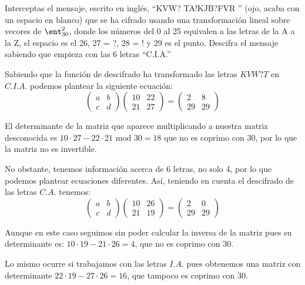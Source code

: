 \begin{problem}[4]
Interceptas el mensaje, escrito en inglés, ``KVW? TA!KJB?FVR '' (ojo, acaba con un espacio en blanco) que se ha cifrado usando una transformación lineal sobre vecores de $\ent_{30}^2$, donde los números del 0 al 25 equivalen a las letras de la A a la Z, el espacio es el 26, 27 = ?, 28 = ! y 29 es el punto. Descifra el mensaje sabiendo que empieza con las 6 letras ``C.I.A.''

\solution
{}

Sabiendo que la función de descifrado ha transformado las letras $KVW? T$ en $C.I.A.$ podemos plantear la siguiente ecuación:
\[
	\left( \begin{array}{cc}
	a & b \\
	c & d
	\end{array} \right)
	\left( \begin{array}{cc}
	10 & 22\\
	21 & 27
	\end{array} \right)
	=
	\left( \begin{array}{cc}
	2 & 8\\
	29 & 29
	\end{array} \right)
\]

El determinante de la matriz que aparece multiplicando a nuestra matriz desconocida es $10 \cdot 27 - 22 \cdot 21 \text{ mod } 30 = 18$ que no es coprimo con 30, por lo que la matriz no es invertible.

No obstante, tenemos información acerca de 6 letras, no solo 4, por lo que podemos plantear ecuaciones diferentes. Así, teniendo en cuenta el descifrado de las letras $C.A.$ tenemos:
\[
	\left( \begin{array}{cc}
	a & b \\
	c & d
	\end{array} \right)
	\left( \begin{array}{cc}
	10 & 26\\
	21 & 19
	\end{array} \right)
	=
	\left( \begin{array}{cc}
	2 & 0\\
	29 & 29
	\end{array} \right)
\]

Aunque en este caso seguimos sin poder calcular la inversa de la matriz pues su determinante es: $10\cdot 19-21\cdot 26 = 4$, que no es coprimo con 30.

Lo mismo ocurre si trabajamos con las letras $I.A.$ pues obtenemos una matriz con determinante $22\cdot 19-27\cdot 26 = 16$, que tampoco es coprimo con 30.


\end{problem}
